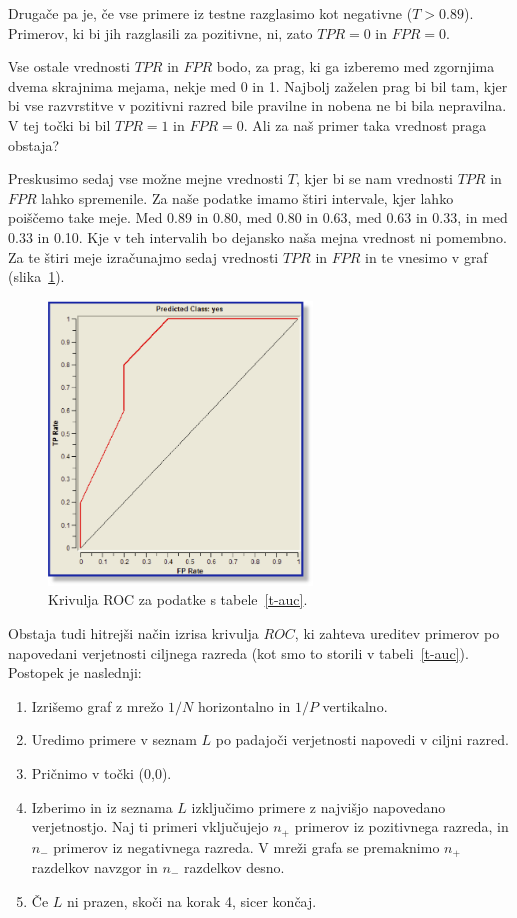 Drugače pa je, če vse primere iz testne razglasimo kot negativne ($T>0.89$). Primerov, ki bi jih razglasili za pozitivne, ni, zato $TPR=0$ in $FPR=0$.

Vse ostale vrednosti $TPR$ in $FPR$ bodo, za prag, ki ga izberemo med zgornjima dvema skrajnima mejama, nekje med 0 in 1. Najbolj zaželen prag bi bil tam, kjer bi vse razvrstitve v pozitivni razred bile pravilne in nobena ne bi bila nepravilna. V tej točki bi bil $TPR=1$ in $FPR=0$. Ali za naš primer taka vrednost praga obstaja?

Preskusimo sedaj vse možne mejne vrednosti $T$, kjer bi se nam vrednosti $TPR$ in $FPR$ lahko spremenile. Za naše podatke imamo štiri intervale, kjer lahko poiščemo take meje. Med 0.89 in 0.80, med 0.80 in 0.63, med 0.63 in 0.33, in med 0.33 in 0.10. Kje v teh intervalih bo dejansko naša mejna vrednost ni pomembno. Za te štiri meje izračunajmo sedaj vrednosti $TPR$ in $FPR$ in te vnesimo v graf (slika~\ref{f-roc}).

\begin{figure}[htbp]
\begin{center}
\includegraphics[width=7cm]{slike/roc.png}
\caption{Krivulja ROC za podatke s tabele~\ref{t-auc}.}
\label{f-roc}
\end{center}
\end{figure}

Obstaja tudi hitrejši način izrisa krivulja $ROC$, ki zahteva ureditev primerov po napovedani verjetnosti ciljnega razreda (kot smo to storili v tabeli~\ref{t-auc}). Postopek je naslednji:
%
\begin{enumerate}
\item Izrišemo graf z mrežo $1/N$ horizontalno in $1/P$ vertikalno.
\item Uredimo primere v seznam $L$ po padajoči verjetnosti napovedi v ciljni razred.
\item Pričnimo v točki (0,0).
\item Izberimo in iz seznama $L$ izključimo primere z najvišjo napovedano verjetnostjo. Naj ti primeri vključujejo $n_+$ primerov iz pozitivnega razreda, in $n_-$ primerov iz negativnega razreda. V mreži grafa se premaknimo $n_+$ razdelkov navzgor in $n_-$ razdelkov desno.
\item Če $L$ ni prazen, skoči na korak 4, sicer končaj.
\end{enumerate}

